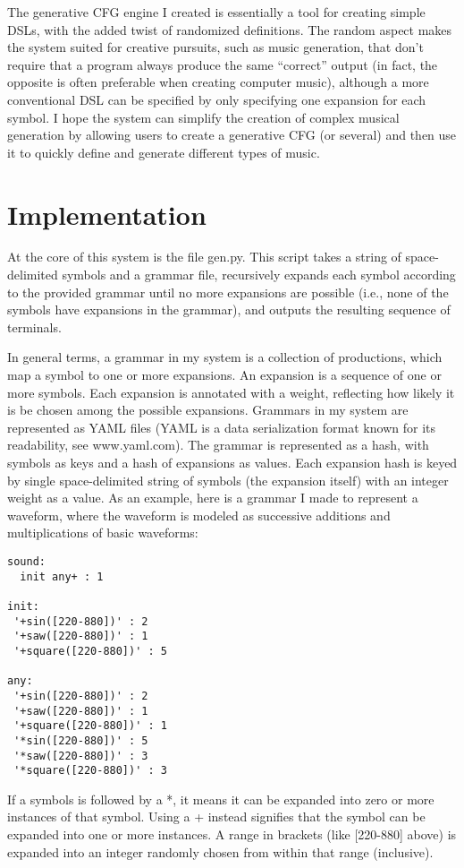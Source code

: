 \documentclass[11pt]{article}
\begin{document}
The generative CFG engine I created is essentially a tool for creating simple
DSLs, with the added twist of randomized definitions.  The random aspect makes
the system suited for creative pursuits, such as music generation, that don't
require that a program always produce the same ``correct'' output (in fact,
the opposite is often preferable when creating computer music), although a
more conventional DSL can be specified by only specifying one expansion for
each symbol.  I hope the system can simplify the creation of complex musical
generation by allowing users to create a generative CFG (or several) and then
use it to quickly define and generate different types of music.

\section*{Implementation}
At the core of this system is the file gen.py. This script takes a string of
space-delimited symbols and a grammar file, recursively expands each symbol
according to the provided grammar until no more expansions are possible (i.e.,
none of the symbols have expansions in the grammar), and outputs the resulting
sequence of terminals.

In general terms, a grammar in my system is a collection of productions, which
map a symbol to one or more expansions.  An expansion is a sequence of one or
more symbols.  Each expansion is annotated with a weight, reflecting how
likely it is be chosen among the possible expansions.  Grammars in my system
are represented as YAML files (YAML is a data serialization format known for
its readability, see www.yaml.com).  The grammar is represented as a hash,
with symbols as keys and a hash of expansions as values.  Each expansion hash
is keyed by single space-delimited string of symbols (the expansion itself)
with an integer weight as a value.  As an example, here is a grammar I made to
represent a waveform, where the waveform is modeled as successive additions
and multiplications of basic waveforms:
\begin{verbatim}
sound:
  init any+ : 1

init:
 '+sin([220-880])' : 2
 '+saw([220-880])' : 1
 '+square([220-880])' : 5

any:
 '+sin([220-880])' : 2
 '+saw([220-880])' : 1
 '+square([220-880])' : 1
 '*sin([220-880])' : 5
 '*saw([220-880])' : 3
 '*square([220-880])' : 3
\end{verbatim}

If a symbols is followed by a *, it means it can be expanded into zero or more
instances of that symbol. Using a + instead signifies that the symbol can be
expanded into one or more instances.  A range in brackets (like [220-880]
above) is expanded into an integer randomly chosen from within that range
(inclusive).
\end{document}
